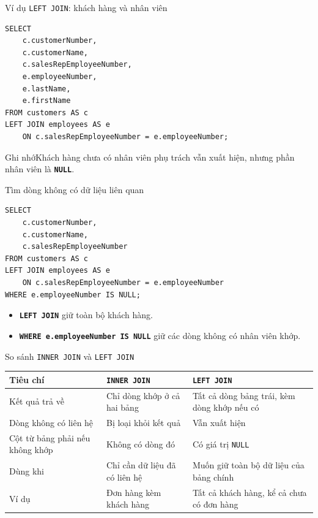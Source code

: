 \documentclass[aspectratio=169,11pt]{beamer}
\newcommand{\kw}[1]{\textbf{\texttt{#1}}}
\newcommand{\hint}[1]{\begin{block}{Ghi nhớ}#1\end{block}}
\begin{document}
\begin{frame}[fragile]{Ví dụ \texttt{LEFT JOIN}: khách hàng và nhân viên}
\begin{lstlisting}
SELECT
    c.customerNumber,
    c.customerName,
    c.salesRepEmployeeNumber,
    e.employeeNumber,
    e.lastName,
    e.firstName
FROM customers AS c
LEFT JOIN employees AS e
    ON c.salesRepEmployeeNumber = e.employeeNumber;
\end{lstlisting}
\hint{Khách hàng chưa có nhân viên phụ trách vẫn xuất hiện, nhưng phần nhân viên là \kw{NULL}.}
\end{frame}

\begin{frame}[fragile]{Tìm dòng không có dữ liệu liên quan}
\begin{lstlisting}
SELECT
    c.customerNumber,
    c.customerName,
    c.salesRepEmployeeNumber
FROM customers AS c
LEFT JOIN employees AS e
    ON c.salesRepEmployeeNumber = e.employeeNumber
WHERE e.employeeNumber IS NULL;
\end{lstlisting}
\begin{itemize}
  \item \kw{LEFT JOIN} giữ toàn bộ khách hàng.
  \item \kw{WHERE e.employeeNumber IS NULL} giữ các dòng không có nhân viên khớp.
\end{itemize}
\end{frame}

\begin{frame}{So sánh \texttt{INNER JOIN} và \texttt{LEFT JOIN}}
\scriptsize
\begin{tabularx}{\textwidth}{l X X}
\toprule
Tiêu chí & \texttt{INNER JOIN} & \texttt{LEFT JOIN} \\
\midrule
Kết quả trả về & Chỉ dòng khớp ở cả hai bảng & Tất cả dòng bảng trái, kèm dòng khớp nếu có \\
Dòng không có liên hệ & Bị loại khỏi kết quả & Vẫn xuất hiện \\
Cột từ bảng phải nếu không khớp & Không có dòng đó & Có giá trị \texttt{NULL} \\
Dùng khi & Chỉ cần dữ liệu đã có liên hệ & Muốn giữ toàn bộ dữ liệu của bảng chính \\
Ví dụ & Đơn hàng kèm khách hàng & Tất cả khách hàng, kể cả chưa có đơn hàng \\
\bottomrule
\end{tabularx}
\end{frame}
\end{document}

